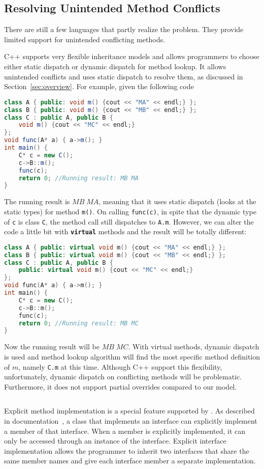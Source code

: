 \subsection{Resolving Unintended Method Conflicts}
There are still a few languages that partly realize the problem. They provide limited support for unintended conflicting methods. 

C++ supports very flexible inheritance models and allows programmers to choose either static dispatch or dynamic dispatch for method lookup.
It allows unintended conflicts and uses static dispatch to resolve them, as discussed in Section~\ref{sec:overview}. For example, given the following code
\begin{lstlisting}[language=Java]
class A { public: void m() {cout << "MA" << endl;} };
class B { public: void m() {cout << "MB" << endl;} };
class C : public A, public B { 
	void m() {cout << "MC" << endl;}
};
void func(A* a) { a->m(); }
int main() {
	C* c = new C();
	c->B::m();
	func(c); 
	return 0; //Running result: MB MA
}
\end{lstlisting}
The running result is $MB \; MA$, meaning that it uses static dispatch (looks at the static types) for method \lstinline|m()|. 
On calling \texttt{func(c)}, in spite that the dynamic type of \texttt{c} is class \texttt{C}, the method call still dispatches to 
\lstinline|A.m|.
However, we can alter the code a little bit with \textbf{\texttt{virtual}} methods and the result will be totally different:
\begin{lstlisting}[language=c++]
class A { public: virtual void m() {cout << "MA" << endl;} };
class B { public: virtual void m() {cout << "MB" << endl;} };
class C : public A, public B { 
    public: virtual void m() {cout << "MC" << endl;}
};
void func(A* a) { a->m(); }
int main() {
	C* c = new C();
	c->B::m();
	func(c); 
	return 0; //Running result: MB MC
}
\end{lstlisting}
Now the running result will be $MB \; MC$. With virtual methods, dynamic dispatch is used and 
method lookup algorithm will find the most specific method definition of $m$, namely \lstinline|C.m| at this time.
Although C++ support this flexibility, unfortunately, dynamic dispatch on conflicting methods will be problematic.
Furthermore, it does not support partial overrides compared to our model.

\begin{lstlisting}
\end{lstlisting}

Explicit method implementation is a special feature supported by \csharp{}. As described in \csharp{}
documentation~\cite{csharpdoc}, a class that implements an interface can explicitly implement a member of that
interface. When a member is explicitly implemented, it can only be accessed through an instance
of the interface. Explicit interface implementation allows the programmer to inherit two interfaces 
that share the same member names and give each interface member a separate implementation.

